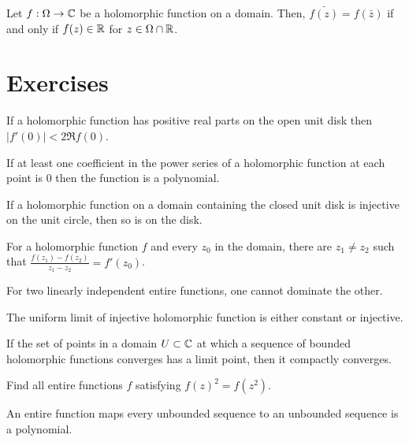 \documentclass{../note}
\begin{document}
\begin{prb}
Let $f:\Omega\to\mathbb{C}$ be a holomorphic function on a domain.
Then, $\bar{f(z)}=f(\bar z)$ if and only if $f(z)\in\mathbb{R}$ for $z\in\Omega\cap\mathbb{R}$.
\end{prb}





\section*{Exercises}

\begin{prb}
If a holomorphic function has positive real parts on the open unit disk then $|f'(0)|<2\Re f(0)$.
\end{prb}

\begin{prb}
If at least one coefficient in the power series of a holomorphic function at each point is 0 then the function is a polynomial.
\end{prb}

\begin{prb}
If a holomorphic function on a domain containing the closed unit disk is injective on the unit circle, then so is on the disk.
\end{prb}

\begin{prb}
For a holomorphic function $f$ and every $z_0$ in the domain, there are $z_1\ne z_2$ such that $\frac{f(z_1)-f(z_2)}{z_1-z_2}=f'(z_0)$.
\end{prb}

\begin{prb}
For two linearly independent entire functions, one cannot dominate the other.
\end{prb}

\begin{prb}
The uniform limit of injective holomorphic function is either constant or injective.
\end{prb}

\begin{prb}
If the set of points in a domain $U\subset\mathbb{C}$ at which a sequence of bounded holomorphic functions converges has a limit point, then it compactly converges.
\end{prb}

\begin{prb}
Find all entire functions $f$ satisfying $f(z)^2=f(z^2)$.
\end{prb}

\begin{prb}
An entire function maps every unbounded sequence to an unbounded sequence is a polynomial.
\end{prb}
\end{document}
